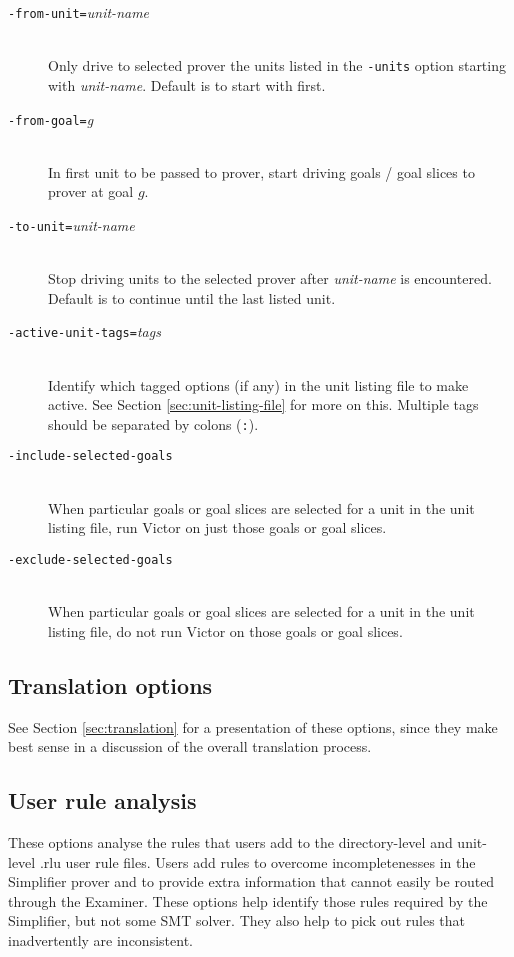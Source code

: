 \documentclass[12pt,fleqn]{article}
\newcommand{\optionb}[1]{\item[\texttt{-{#1}}]\ \\}
\newcommand{\optionv}[2]{\item[\texttt{-{#1}=}\mdseries\textit{#2}]\ \\}
\begin{document}
\begin{description}
\optionv{from-unit}{unit-name}
  Only drive to selected prover the units listed in the \texttt{-units} option
  starting with \textit{unit-name}.  Default is to start with first. 

\optionv{from-goal}{g}
  In first unit to be passed to prover, start driving goals / goal
  slices to prover at goal $g$.

\optionv{to-unit}{unit-name}
  Stop driving units to the selected prover after \textit{unit-name} is 
  encountered. Default is to continue until the last listed unit.

\optionv{active-unit-tags}{tags}
  Identify which tagged options (if any) in the unit listing file to make
  active.  See Section \ref{sec:unit-listing-file} for more on this.
  Multiple tags should be separated by colons (\texttt{:}).

\optionb{include-selected-goals}
  When particular goals or goal slices are selected for a unit in the
  unit listing file, run Victor on just those goals or goal slices.

\optionb{exclude-selected-goals}
  When particular goals or goal slices are selected for a unit in the
  unit listing file, do not run Victor on those goals or goal slices.

\end{description}
\subsection{Translation options}

See Section \ref{sec:translation} for a presentation of these options,
since they make best sense in a discussion of the overall translation
process.

\subsection{User rule analysis}
\label{sec:user-rule-analysis}

These options analyse the rules that users add to the directory-level
and unit-level .rlu user rule files.  Users add rules to overcome
incompletenesses in the Simplifier prover and to provide extra
information that cannot easily be routed through the Examiner.  These
options help identify those rules required by the Simplifier, but not
some SMT solver.  They also help to pick out rules that inadvertently
are inconsistent.
\end{document}
